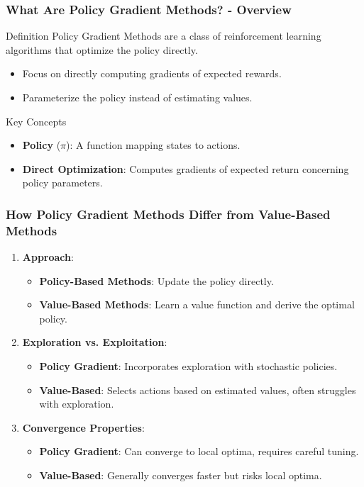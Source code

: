 \documentclass{beamer}
\begin{document}
\begin{frame}[fragile]
    \frametitle{What Are Policy Gradient Methods? - Overview}
    \begin{block}{Definition}
        Policy Gradient Methods are a class of reinforcement learning algorithms that optimize the policy directly.
    \end{block}
    
    \begin{itemize}
        \item Focus on directly computing gradients of expected rewards.
        \item Parameterize the policy instead of estimating values.
    \end{itemize}
    
    \begin{block}{Key Concepts}
        \begin{itemize}
            \item \textbf{Policy} (\(\pi\)): A function mapping states to actions.
            \item \textbf{Direct Optimization}: Computes gradients of expected return concerning policy parameters.
        \end{itemize}
    \end{block}
\end{frame}

\begin{frame}[fragile]
    \frametitle{How Policy Gradient Methods Differ from Value-Based Methods}
    \begin{enumerate}
        \item \textbf{Approach}:
            \begin{itemize}
                \item \textbf{Policy-Based Methods}: Update the policy directly.
                \item \textbf{Value-Based Methods}: Learn a value function and derive the optimal policy.
            \end{itemize}
        
        \item \textbf{Exploration vs. Exploitation}:
            \begin{itemize}
                \item \textbf{Policy Gradient}: Incorporates exploration with stochastic policies.
                \item \textbf{Value-Based}: Selects actions based on estimated values, often struggles with exploration.
            \end{itemize}

        \item \textbf{Convergence Properties}:
            \begin{itemize}
                \item \textbf{Policy Gradient}: Can converge to local optima, requires careful tuning.
                \item \textbf{Value-Based}: Generally converges faster but risks local optima.
            \end{itemize}
    \end{enumerate}
\end{frame}
\end{document}
